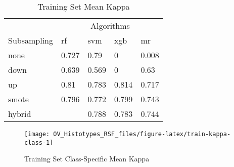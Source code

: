 \documentclass[
]{report}
\begin{document}
\begin{table}

\caption{\label{tab:train-kappa-table}Training Set Mean Kappa}
\centering
\begin{tabular}[t]{l|l|l|l|l}
\hline
\multicolumn{1}{c|}{ } & \multicolumn{4}{c}{Algorithms} \\
\cline{2-5}
Subsampling & rf & svm & xgb & mr\\
\hline
none & 0.727 & 0.79 & 0 & 0.008\\
\hline
down & 0.639 & 0.569 & 0 & 0.63\\
\hline
up & 0.81 & 0.783 & 0.814 & 0.717\\
\hline
smote & 0.796 & 0.772 & 0.799 & 0.743\\
\hline
hybrid & \cellcolor[HTML]{90ee90}{0.819} & 0.788 & 0.783 & 0.744\\
\hline
\end{tabular}
\end{table}

\begin{figure}[H]

{\centering \texttt{[image: OV\_Histotypes\_RSF\_files/figure-latex/train-kappa-class-1]} 

}

\caption{Training Set Class-Specific Mean Kappa}\label{fig:train-kappa-class}
\end{figure}
\end{document}

